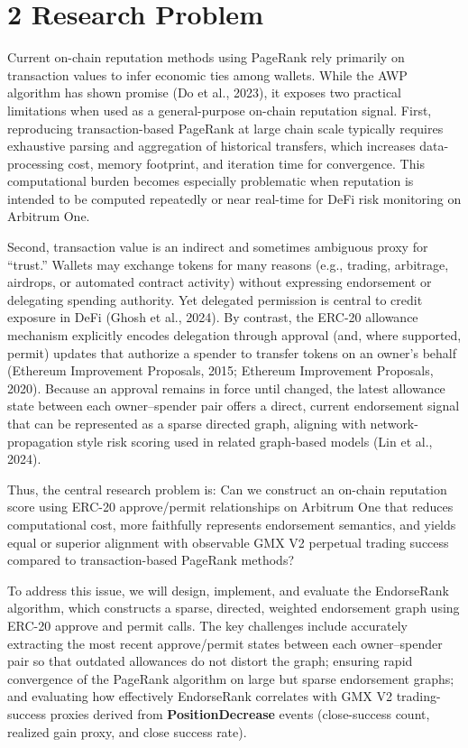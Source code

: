 \clearpage
{}
\section*{2 \textbf{Research Problem}}
\label{sec:research-problem}

Current on-chain reputation methods using PageRank rely primarily on transaction values to infer economic ties among wallets. While the AWP algorithm has shown promise (Do et al., 2023), it exposes two practical limitations when used as a general-purpose on-chain reputation signal. First, reproducing transaction-based PageRank at large chain scale typically requires exhaustive parsing and aggregation of historical transfers, which increases data-processing cost, memory footprint, and iteration time for convergence. This computational burden becomes especially problematic when reputation is intended to be computed repeatedly or near real-time for DeFi risk monitoring on Arbitrum One.


Second, transaction value is an indirect and sometimes ambiguous proxy for ``trust.'' Wallets may exchange tokens for many reasons (e.g., trading, arbitrage, airdrops, or automated contract activity) without expressing endorsement or delegating spending authority. Yet delegated permission is central to credit exposure in DeFi (Ghosh et al., 2024). By contrast, the ERC-20 allowance mechanism explicitly encodes delegation through approval (and, where supported, permit) updates that authorize a spender to transfer tokens on an owner's behalf (Ethereum Improvement Proposals, 2015; Ethereum Improvement Proposals, 2020). Because an approval remains in force until changed, the latest allowance state between each owner--spender pair offers a direct, current endorsement signal that can be represented as a sparse directed graph, aligning with network-propagation style risk scoring used in related graph-based models (Lin et al., 2024).


Thus, the central research problem is: Can we construct an on-chain reputation score using ERC-20 approve/permit relationships on Arbitrum One that reduces computational cost, more faithfully represents endorsement semantics, and yields equal or superior alignment with observable GMX V2 perpetual trading success compared to transaction-based PageRank methods?


To address this issue, we will design, implement, and evaluate the EndorseRank algorithm, which constructs a sparse, directed, weighted endorsement graph using ERC-20 approve and permit calls. The key challenges include accurately extracting the most recent approve/permit states between each owner--spender pair so that outdated allowances do not distort the graph; ensuring rapid convergence of the PageRank algorithm on large but sparse endorsement graphs; and evaluating how effectively EndorseRank correlates with GMX V2 trading-success proxies derived from \textbf{PositionDecrease} events (close-success count, realized gain proxy, and close success rate).


